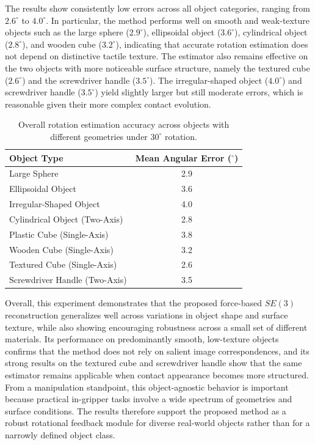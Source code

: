 \documentclass[letterpaper,10pt,journal,twoside]{IEEEtran}
\begin{document}
The results show consistently low errors across all object categories, ranging from $2.6^\circ$ to $4.0^\circ$. In particular, the method performs well on smooth and weak-texture objects such as the large sphere ($2.9^\circ$), ellipsoidal object ($3.6^\circ$), cylindrical object ($2.8^\circ$), and wooden cube ($3.2^\circ$), indicating that accurate rotation estimation does not depend on distinctive tactile texture. The estimator also remains effective on the two objects with more noticeable surface structure, namely the textured cube ($2.6^\circ$) and the screwdriver handle ($3.5^\circ$). The irregular-shaped object ($4.0^\circ$) and screwdriver handle ($3.5^\circ$) yield slightly larger but still moderate errors, which is reasonable given their more complex contact evolution.

\begin{table}[ht]
    \centering
    \caption{Overall rotation estimation accuracy across objects with different geometries under $30^\circ$ rotation.}
    \label{tab:object_rotation}
    \begin{tabular}{lc}
        \toprule
        Object Type & Mean Angular Error ($^\circ$) \\
        \midrule
        Large Sphere & 2.9 \\
        Ellipsoidal Object & 3.6 \\
        Irregular-Shaped Object & 4.0 \\
        Cylindrical Object (Two-Axis) & 2.8 \\
        Plastic Cube (Single-Axis) & 3.8 \\
        Wooden Cube (Single-Axis) & 3.2 \\
        Textured Cube (Single-Axis) & 2.6 \\
        Screwdriver Handle (Two-Axis) & 3.5 \\
        \bottomrule
    \end{tabular}
\end{table}

Overall, this experiment demonstrates that the proposed force-based $SE(3)$ reconstruction generalizes well across variations in object shape and surface texture, while also showing encouraging robustness across a small set of different materials. Its performance on predominantly smooth, low-texture objects confirms that the method does not rely on salient image correspondences, and its strong results on the textured cube and screwdriver handle show that the same estimator remains applicable when contact appearance becomes more structured. From a manipulation standpoint, this object-agnostic behavior is important because practical in-gripper tasks involve a wide spectrum of geometries and surface conditions. The results therefore support the proposed method as a robust rotational feedback module for diverse real-world objects rather than for a narrowly defined object class.
\end{document}
